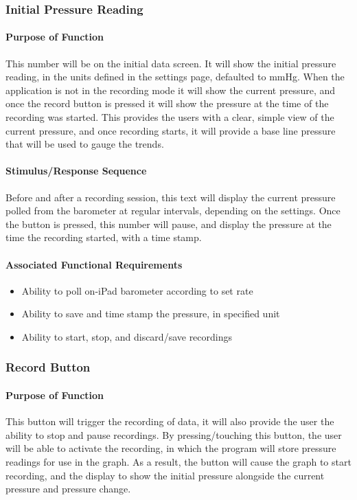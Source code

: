 \documentclass[onecolumn, draftclsnofoot,10pt, compsoc]{IEEEtran}
\begin{document}
\subsubsection{Initial Pressure Reading}

\paragraph{Purpose of Function}
This number will be on the initial data screen.
It will show the initial pressure reading, in the units defined in the settings page, defaulted to mmHg.
When the application is not in the recording mode it will show the current pressure, and once the record button is pressed it will show the pressure at the time of the recording was started.
This provides the users with a clear, simple view of the current pressure, and once recording starts, it will provide a base line pressure that will be used to gauge the trends.
\paragraph{Stimulus/Response Sequence}
Before and after a recording session, this text will display the current pressure polled from the barometer at regular intervals, depending on the settings.
Once the button is pressed, this number will pause, and display the pressure at the time the recording started, with a time stamp.

\paragraph{Associated Functional Requirements}
\begin{itemize}
\item Ability to poll on-iPad barometer according to set rate
\item Ability to save and time stamp the pressure, in specified unit
\item Ability to start, stop, and discard/save recordings
\end{itemize}

\subsubsection{Record Button}

\paragraph{Purpose of Function}
This button will trigger the recording of data, it will also provide the user the ability to stop and pause recordings.
By pressing/touching this button, the user will be able to activate the recording, in which the program will store pressure readings for use in the graph.
As a result, the button will cause the graph to start recording, and the display to show the initial pressure alongside the current pressure and pressure change.
\end{document}
